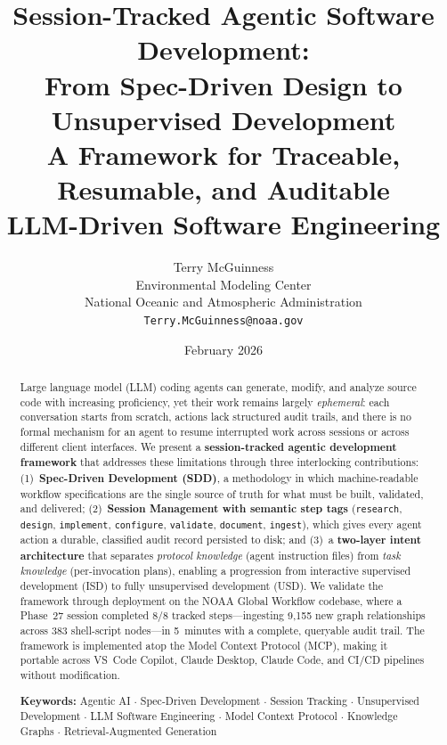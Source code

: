 \documentclass[11pt,letterpaper]{article}
\title{%
    \textbf{Session-Tracked Agentic Software Development:} \\[0.3em]
    \textbf{From Spec-Driven Design to Unsupervised Development} \\[0.8em]
    \large A Framework for Traceable, Resumable, and Auditable \\
    \large LLM-Driven Software Engineering
}
\author{
    Terry McGuinness \\
    Environmental Modeling Center \\
    National Oceanic and Atmospheric Administration \\
    \texttt{Terry.McGuinness@noaa.gov}
}
\date{February 2026}
\begin{document}

\maketitle

\begin{abstract}
Large language model (LLM) coding agents can generate, modify, and analyze
source code with increasing proficiency, yet their work remains largely
\emph{ephemeral}: each conversation starts from scratch, actions lack
structured audit trails, and there is no formal mechanism for an agent to
resume interrupted work across sessions or across different client
interfaces.  We present a \textbf{session-tracked agentic development
framework} that addresses these limitations through three interlocking
contributions:
(1)~\textbf{Spec-Driven Development (SDD)}, a methodology in which
machine-readable workflow specifications are the single source of truth
for what must be built, validated, and delivered;
(2)~\textbf{Session Management with semantic step tags}
(\texttt{research}, \texttt{design}, \texttt{implement},
\texttt{configure}, \texttt{validate}, \texttt{document},
\texttt{ingest}), which gives every agent action a durable, classified
audit record persisted to disk;
and (3)~a \textbf{two-layer intent architecture} that separates
\emph{protocol knowledge} (agent instruction files) from \emph{task
knowledge} (per-invocation plans), enabling a progression from
interactive supervised development (ISD) to fully unsupervised
development (USD).
We validate the framework through deployment on the NOAA Global Workflow
codebase, where a Phase~27 session completed 8/8 tracked steps---ingesting
9{,}155 new graph relationships across 383 shell-script nodes---in
5~minutes with a complete, query\-able audit trail.  The framework is
implemented atop the Model Context Protocol (MCP), making it portable
across VS~Code Copilot, Claude Desktop, Claude Code, and CI/CD pipelines
without modification.

\medskip\noindent
\textbf{Keywords:}
Agentic AI $\cdot$ Spec-Driven Development $\cdot$
Session Tracking $\cdot$ Unsupervised Development $\cdot$
LLM Software Engineering $\cdot$ Model Context Protocol $\cdot$
Knowledge Graphs $\cdot$ Retrieval-Augmented Generation
\end{abstract}

\tableofcontents
\newpage
\end{document}
